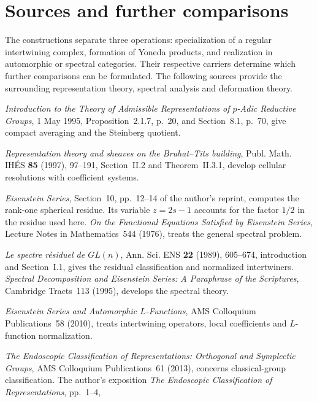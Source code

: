 \section{Sources and further comparisons}
\label{v4-arith:w10-d:summary}
\label{v4-arith:w10-d:sources}
\label{v4-arith:w10-d:sources-bib}
The constructions separate three operations: specialization of a
regular intertwining complex, formation of Yoneda products, and
realization in automorphic or spectral categories. Their respective
carriers determine which further comparisons can be formulated.
The following sources provide the surrounding representation theory,
spectral analysis and deformation theory.
\begin{description}[style=nextline,leftmargin=0pt,labelwidth=0pt]
\item[Casselman.]
\emph{Introduction to the Theory of Admissible Representations of
$p$-Adic Reductive Groups}, 1 May 1995, Proposition~2.1.7, p.~20,
and Section~8.1, p.~70, give compact averaging and the Steinberg quotient.
\item[Schneider--Stuhler.]
\emph{Representation theory and sheaves on the Bruhat--Tits building},
Publ. Math. IH\'ES \textbf{85} (1997), 97--191, Section~II.2 and
Theorem~II.3.1, develop cellular resolutions with coefficient systems.
\item[Langlands.]
\emph{Eisenstein Series}, Section~10, pp.~12--14 of the author's reprint,
computes the rank-one spherical residue. Its variable $z=2s-1$
accounts for the factor $1/2$ in the residue used here.
\emph{On the Functional Equations Satisfied by Eisenstein Series},
Lecture Notes in Mathematics~544 (1976), treats the general spectral problem.
\item[Mo{\oe}glin--Waldspurger.]
\emph{Le spectre r\'esiduel de $GL(n)$}, Ann. Sci. ENS
\textbf{22} (1989), 605--674, introduction and Section~I.1, gives the
residual classification and normalized intertwiners.
\emph{Spectral Decomposition and Eisenstein Series: A Paraphrase of
the Scriptures}, Cambridge Tracts~113 (1995), develops the spectral theory.
\item[Shahidi.]
\emph{Eisenstein Series and Automorphic $L$-Functions}, AMS Colloquium
Publications~58 (2010), treats intertwining operators, local coefficients
and $L$-function normalization.
\item[Arthur.]
\emph{The Endoscopic Classification of Representations: Orthogonal and
Symplectic Groups}, AMS Colloquium Publications~61 (2013), concerns
classical-group classification. The author's exposition
\emph{The Endoscopic Classification of Representations}, pp.~1--4,

\end{description}
